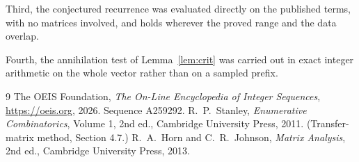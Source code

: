 \documentclass[11pt,a4paper]{article}
\theoremstyle{plain}
\theoremstyle{definition}
\begin{document}
Third, the conjectured recurrence was evaluated directly on the published terms, with no
matrices involved, and holds wherever the proved range and the data overlap.

Fourth, the annihilation test of Lemma~\ref{lem:crit} was carried out in exact integer
arithmetic on the whole vector rather than on a sampled prefix.

\begin{thebibliography}{9}
 The OEIS Foundation, \emph{The On-Line Encyclopedia of Integer
Sequences}, \url{https://oeis.org}, 2026. Sequence A259292.
 R.~P.~Stanley, \emph{Enumerative Combinatorics}, Volume 1, 2nd ed.,
Cambridge University Press, 2011. (Transfer-matrix method, Section 4.7.)
 R.~A.~Horn and C.~R.~Johnson, \emph{Matrix Analysis}, 2nd ed., Cambridge
University Press, 2013.
\end{thebibliography}
\end{document}
